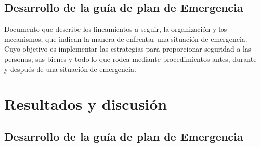     \subsection{Desarrollo de la guía de plan de Emergencia}
    
    Documento que describe los lineamientos a seguir, la organización y los mecanismos, que indican la manera de enfrentar una situación de emergencia. Cuyo objetivo es implementar las estrategias para proporcionar seguridad a las personas, sus bienes y todo lo que rodea mediante procedimientos antes, durante y después de una situación de emergencia.
    
    
    
    
    
    
    
    
    \section{Resultados y discusión}
    
    \subsection{Desarrollo de la guía de plan de Emergencia}
    
